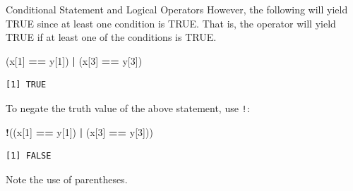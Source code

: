 \documentclass[
  ignorenonframetext,
]{beamer}
\newenvironment{Shaded}{\begin{snugshade}}{\end{snugshade}}
\newcommand{\DecValTok}[1]{\textcolor[rgb]{0.00,0.00,0.81}{#1}}
\newcommand{\NormalTok}[1]{#1}
\newcommand{\SpecialCharTok}[1]{\textcolor[rgb]{0.81,0.36,0.00}{\textbf{#1}}}
\begin{document}
\begin{frame}[fragile]{Conditional Statement and Logical Operators}
\protect\hypertarget{conditional-statement-and-logical-operators-1}{}
However, the following will yield TRUE since at least one condition is
TRUE. That is, the \texttt{\textbar{}} operator will yield TRUE if at
least one of the conditions is TRUE.

\small

\begin{Shaded}
\begin{Highlighting}[]
\NormalTok{(x[}\DecValTok{1}\NormalTok{] }\SpecialCharTok{==}\NormalTok{ y[}\DecValTok{1}\NormalTok{]) }\SpecialCharTok{|}\NormalTok{ (x[}\DecValTok{3}\NormalTok{] }\SpecialCharTok{==}\NormalTok{ y[}\DecValTok{3}\NormalTok{])}
\end{Highlighting}
\end{Shaded}

\begin{verbatim}
[1] TRUE
\end{verbatim}

\normalsize

To negate the truth value of the above statement, use \texttt{!}:

\small

\begin{Shaded}
\begin{Highlighting}[]
\SpecialCharTok{!}\NormalTok{((x[}\DecValTok{1}\NormalTok{] }\SpecialCharTok{==}\NormalTok{ y[}\DecValTok{1}\NormalTok{]) }\SpecialCharTok{|}\NormalTok{ (x[}\DecValTok{3}\NormalTok{] }\SpecialCharTok{==}\NormalTok{ y[}\DecValTok{3}\NormalTok{]))}
\end{Highlighting}
\end{Shaded}

\begin{verbatim}
[1] FALSE
\end{verbatim}

\normalsize

Note the use of parentheses.
\end{frame}
\end{document}
